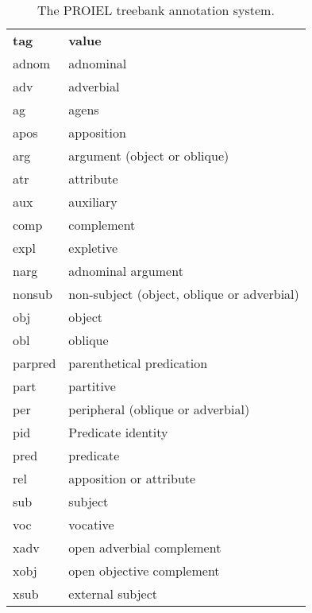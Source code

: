 \begin{table}
  \begin{tabular}{|l|l|}
    \hline
    \textbf{tag} & \textbf{value} \\ \thickhline
    adnom & adnominal \\
    adv & adverbial \\
    ag & agens \\
    apos & apposition \\
    arg & argument (object or oblique) \\
    atr & attribute \\
    aux & auxiliary \\
    comp & complement \\
    expl & expletive \\
    narg & adnominal argument \\
    nonsub & non-subject (object, oblique or adverbial) \\
    obj & object \\
    obl & oblique \\
    parpred & parenthetical predication \\
    part & partitive \\
    per & peripheral (oblique or adverbial) \\
    pid & Predicate identity \\
    pred & predicate \\
    rel & apposition or attribute \\
    sub & subject \\
    voc & vocative \\
    xadv & open adverbial complement \\
    xobj & open objective complement \\
    xsub & external subject \\
     \hline
     \hline
  \end{tabular}
  \caption{The PROIEL treebank annotation system.} \label{table:proiellemmata}
\end{table}
